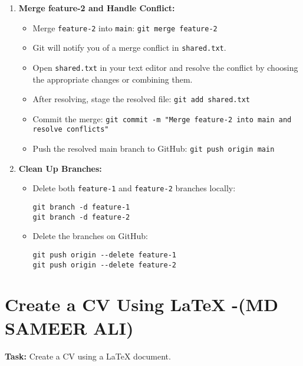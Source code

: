 \documentclass[a4paper,15pt]{article}
\begin{document}
\begin{enumerate}[label=\arabic*.]
    \item \textbf{Merge feature-2 and Handle Conflict:}
    \begin{itemize}
        \item Merge \texttt{feature-2} into \texttt{main}: \texttt{git merge feature-2}
        \item Git will notify you of a merge conflict in \texttt{shared.txt}.
        \item Open \texttt{shared.txt} in your text editor and resolve the conflict by choosing the appropriate changes or combining them.
        \item After resolving, stage the resolved file: \texttt{git add shared.txt}
        \item Commit the merge: \texttt{git commit -m "Merge feature-2 into main and resolve conflicts"}
        \item Push the resolved main branch to GitHub: \texttt{git push origin main}
    \end{itemize}

    \item \textbf{Clean Up Branches:}
    \begin{itemize}
        \item Delete both \texttt{feature-1} and \texttt{feature-2} branches locally:
        \begin{verbatim}
git branch -d feature-1
git branch -d feature-2
        \end{verbatim}
        \item Delete the branches on GitHub:
        \begin{verbatim}
git push origin --delete feature-1
git push origin --delete feature-2
        \end{verbatim}
    \end{itemize}
\end{enumerate}

 \newpage

\section{Create a CV Using LaTeX -(MD SAMEER ALI)}

\textbf{Task:} Create a CV using a LaTeX document.
\end{document}
